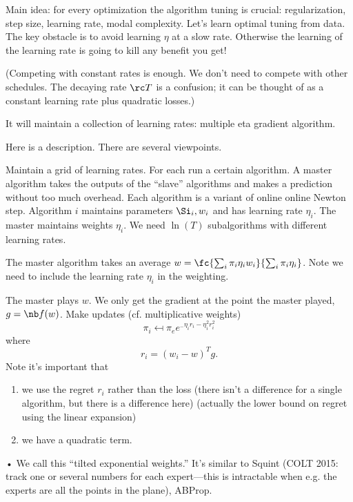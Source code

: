 Main idea: for every optimization the algorithm tuning is crucial: regularization, step size, learning rate, modal complexity. Let's learn optimal tuning from data. The key obstacle is to avoid learning $\eta$ at a slow rate. Otherwise the learning of the learning rate is going to kill any benefit you get!


(Competing with constant rates is enough. We don't need to compete with other schedules. The decaying rate $\rc T$ is a confusion; it can be thought of as a constant learning rate plus quadratic losses.)

It will maintain a collection of learning rates: multiple eta gradient algorithm.

Here is a description. There are several viewpoints. 


Maintain a grid of learning rates. For each run a certain algorithm. A master algorithm takes the outputs of the ``slave'' algorithms and makes a prediction without too much overhead.
Each algorithm is a variant of online %
online Newton step. Algorithm $i$ maintains parameters $\Si_i, w_i$ and has learning rate $\eta_i$. The master maintains weights $\eta_i$. We need $\ln (T)$ subalgorithms with different learning rates.

The master algorithm takes an average $w=\fc{\sum_i \pi_i \eta_i w_i}{\sum_i \pi_i \eta_i}$. Note we need to include the learning rate $\eta_i$ in the weighting.


The master plays $w$. 
We only get the gradient at the point the master played, $g=\nb f(w)$. Make updates (cf. multiplicative weights)
$$
\pi_i \mapsfrom \pi_e e^{_-\eta_i r_i - \eta_i^2r_i^2}
$$
where 
$$
r_i=(w_i-w)^Tg.
$$
Note it's important that
\begin{enumerate}
\item
we use the regret $r_i$ rather than the loss (there isn't a difference for a single algorithm, but there is a difference here) (actually  the lower bound on regret using the linear expansion)
\item
we have a quadratic term. 
\end{enumerate}•
We call this ``tilted exponential weights.'' It's similar to Squint (COLT 2015: track one or several numbers for each expert---this is intractable when e.g. the experts are all the points in the plane), ABProp. 

